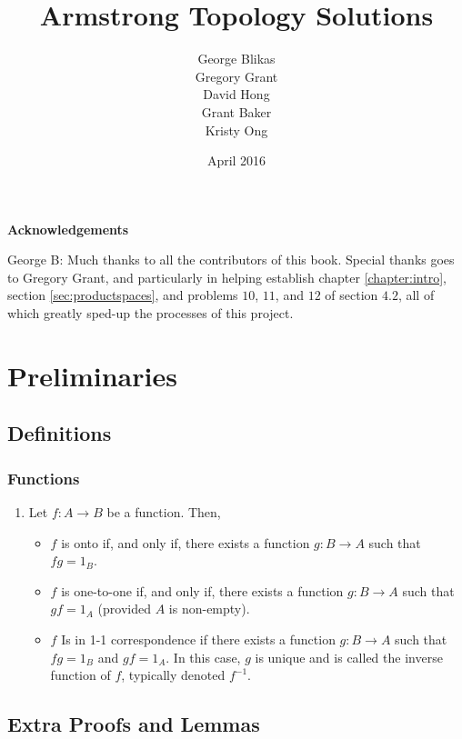 \documentclass{book}
\title{Armstrong Topology Solutions}
\author{George Blikas \\ Gregory Grant \\ David Hong \\ Grant Baker \\ Kristy Ong  \\ \red{Christian Chapman}}
\date{April 2016 \red{(September 2023)}}
\newenvironment{acknowledgements}%
{\cleardoublepage\thispagestyle{empty}\null\vfill\begin{center}%
\bfseries Acknowledgements\end{center}}%
{\vfill\null}
\begin{document}
\maketitle
\thispagestyle{empty} 
\tableofcontents

\begin{acknowledgements}
    George B: Much thanks to all the contributors of this book. Special thanks goes to Gregory Grant, and particularly in helping establish chapter \hyperref[chapter:intro]{\ref{chapter:intro}}, section \hyperref[sec:productspaces]{\ref{sec:productspaces}}, and problems $10$, $11$, and $12$ of section $4.2$, all of which greatly sped-up the processes of this project. 
\end{acknowledgements}

\chapter{Preliminaries}
\section{Definitions}

\subsection{Functions}
\begin{enumerate}[(1)]
    \item Let $f:A \rightarrow B$ be a function. Then, 
        \begin{itemize}
            \item $f$ is onto if, and only if, there exists a function $g: B \rightarrow A$ such that $fg = 1_B$.
            \item $f$ is one-to-one if, and only if, there exists a function $g: B \rightarrow A$ such that $gf = 1_A$ (provided $A$ is non-empty). 
            \item $f$ Is in 1-1 correspondence if there exists a function $g: B \rightarrow A$ such that $fg = 1_B$ and $gf = 1_A$. In this case, $g$ is unique and is called the inverse function of $f$, typically denoted $f^{-1}$. 
        \end{itemize}
\end{enumerate}


\section{Extra Proofs and Lemmas}
\end{document}
